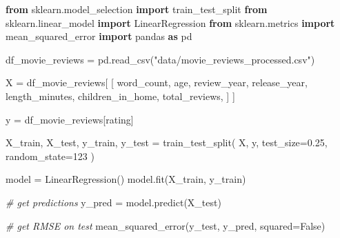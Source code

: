 \documentclass[
  letterpaper,
]{krantz}
\newenvironment{Shaded}{}{}
\newcommand{\CommentTok}[1]{\textcolor[rgb]{0.38,0.63,0.69}{\textit{#1}}}
\newcommand{\DecValTok}[1]{\textcolor[rgb]{0.25,0.63,0.44}{#1}}
\newcommand{\FloatTok}[1]{\textcolor[rgb]{0.25,0.63,0.44}{#1}}
\newcommand{\ImportTok}[1]{\textcolor[rgb]{0.00,0.50,0.00}{\textbf{#1}}}
\newcommand{\NormalTok}[1]{#1}
\newcommand{\OperatorTok}[1]{\textcolor[rgb]{0.40,0.40,0.40}{#1}}
\newcommand{\StringTok}[1]{\textcolor[rgb]{0.25,0.44,0.63}{#1}}
\newcommand{\VariableTok}[1]{\textcolor[rgb]{0.10,0.09,0.49}{#1}}
\begin{document}
\begin{Shaded}
\begin{Highlighting}[]
\ImportTok{from}\NormalTok{ sklearn.model\_selection }\ImportTok{import}\NormalTok{ train\_test\_split}
\ImportTok{from}\NormalTok{ sklearn.linear\_model }\ImportTok{import}\NormalTok{ LinearRegression}
\ImportTok{from}\NormalTok{ sklearn.metrics }\ImportTok{import}\NormalTok{ mean\_squared\_error}
\ImportTok{import}\NormalTok{ pandas }\ImportTok{as}\NormalTok{ pd}

\NormalTok{df\_movie\_reviews }\OperatorTok{=}\NormalTok{ pd.read\_csv(}\StringTok{"data/movie\_reviews\_processed.csv"}\NormalTok{)}

\NormalTok{X }\OperatorTok{=}\NormalTok{ df\_movie\_reviews[}
\NormalTok{    [}
        \StringTok{\textquotesingle{}word\_count\textquotesingle{}}\NormalTok{,}
        \StringTok{\textquotesingle{}age\textquotesingle{}}\NormalTok{,}
        \StringTok{\textquotesingle{}review\_year\textquotesingle{}}\NormalTok{,}
        \StringTok{\textquotesingle{}release\_year\textquotesingle{}}\NormalTok{,}
        \StringTok{\textquotesingle{}length\_minutes\textquotesingle{}}\NormalTok{,}
        \StringTok{\textquotesingle{}children\_in\_home\textquotesingle{}}\NormalTok{,}
        \StringTok{\textquotesingle{}total\_reviews\textquotesingle{}}\NormalTok{,}
\NormalTok{    ]}
\NormalTok{]}

\NormalTok{y }\OperatorTok{=}\NormalTok{ df\_movie\_reviews[}\StringTok{\textquotesingle{}rating\textquotesingle{}}\NormalTok{]}

\NormalTok{X\_train, X\_test, y\_train, y\_test }\OperatorTok{=}\NormalTok{ train\_test\_split(}
\NormalTok{    X, y, test\_size}\OperatorTok{=}\FloatTok{0.25}\NormalTok{, random\_state}\OperatorTok{=}\DecValTok{123}
\NormalTok{)}

\NormalTok{model }\OperatorTok{=}\NormalTok{ LinearRegression()}
\NormalTok{model.fit(X\_train, y\_train)}
\end{Highlighting}
\end{Shaded}

\begin{Shaded}
\begin{Highlighting}[]
\CommentTok{\# get predictions}
\NormalTok{y\_pred }\OperatorTok{=}\NormalTok{ model.predict(X\_test)}

\CommentTok{\# get RMSE on test}
\NormalTok{mean\_squared\_error(y\_test, y\_pred, squared}\OperatorTok{=}\VariableTok{False}\NormalTok{)}
\end{Highlighting}
\end{Shaded}
\end{document}
